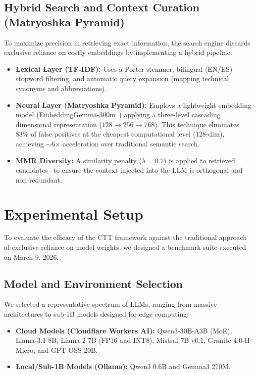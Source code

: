 \documentclass[conference]{IEEEtran}
\begin{document}
\subsection{Hybrid Search and Context Curation (Matryoshka Pyramid)}
To maximize precision in retrieving exact information, the search engine discards exclusive reliance on costly embeddings by implementing a hybrid pipeline:
\begin{itemize}
    \item \textbf{Lexical Layer (TF-IDF):} Uses a Porter stemmer, bilingual (EN/ES) stopword filtering, and automatic query expansion (mapping technical synonyms and abbreviations).
    \item \textbf{Neural Layer (Matryoshka Pyramid):} Employs a lightweight embedding model (EmbeddingGemma-300m~\cite{kusupati2022matryoshka}) applying a three-level cascading dimensional representation ($128 \rightarrow 256 \rightarrow 768$). This technique eliminates 83\% of false positives at the cheapest computational level (128-dim), achieving $\sim$6$\times$ acceleration over traditional semantic search.
    \item \textbf{MMR Diversity:} A similarity penalty ($\lambda = 0.7$) is applied to retrieved candidates~\cite{carbonell1998mmr} to ensure the context injected into the LLM is orthogonal and non-redundant.
\end{itemize}
\section{Experimental Setup}
To evaluate the efficacy of the CTT framework against the traditional approach of exclusive reliance on model weights, we designed a benchmark suite executed on March 9, 2026.
\subsection{Model and Environment Selection}
We selected a representative spectrum of LLMs, ranging from massive architectures to sub-1B models designed for edge computing:
\begin{itemize}
    \item \textbf{Cloud Models (Cloudflare Workers AI):} Qwen3-30B-A3B (MoE), Llama-3.1 8B, Llama-2 7B (FP16 and INT8), Mistral 7B v0.1, Granite 4.0-H-Micro, and GPT-OSS-20B.
    \item \textbf{Local/Sub-1B Models (Ollama):} Qwen3 0.6B and Gemma3 270M.
\end{itemize}
\end{document}
